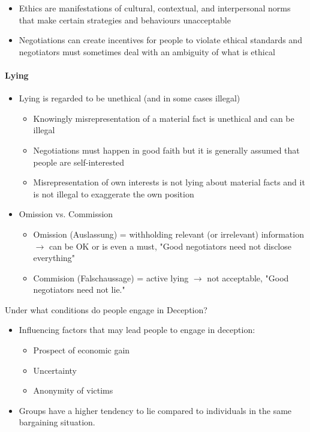 \begin{itemize}
    \item Ethics are manifestations of cultural, contextual, and interpersonal
        norms that make certain strategies and behaviours unacceptable
    \item Negotiations can create incentives for people to violate ethical
        standards and negotiators must sometimes deal with an ambiguity of what
        is ethical
\end{itemize}

\paragraph{Lying}

\begin{itemize}
    \item Lying is regarded to be unethical (and in some cases illegal)
        \begin{itemize}
            \item Knowingly misrepresentation of a material fact is unethical
                and can be illegal
            \item Negotiations must happen in good faith but it is generally
                assumed that people are self-interested
            \item Misrepresentation of own interests is not lying about
                material facts and it is not illegal to exaggerate the own
                position
        \end{itemize}
    \item Omission vs. Commission
        \begin{itemize}
            \item Omission (Auslassung) = withholding relevant (or irrelevant)
                information $\rightarrow$ can be OK or is even a must, "Good
                negotiators need not disclose everything"
            \item Commision (Falschaussage) = active lying $\rightarrow$ not
                acceptable, "Good negotiators need not lie."
        \end{itemize}
\end{itemize}

Under what conditions do people engage in Deception?

\begin{itemize}
    \item Influencing factors that may lead people to engage in deception:
        \begin{itemize}
            \item Prospect of economic gain
            \item Uncertainty
            \item Anonymity of victims
        \end{itemize}
    \item Groups have a higher tendency to lie compared to individuals in the
        same bargaining situation.
\end{itemize}

